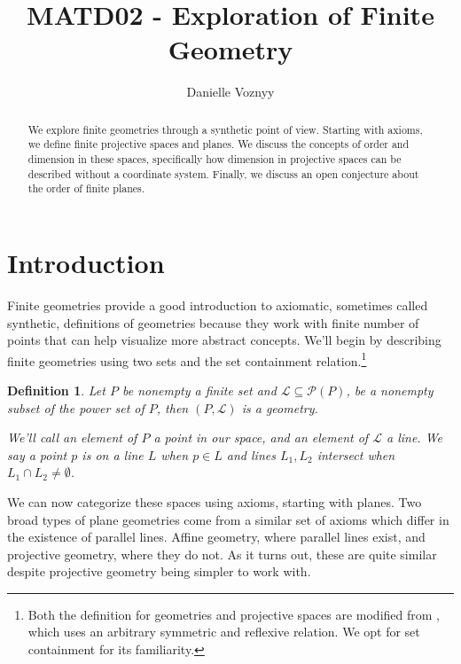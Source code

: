 \documentclass[12pt]{article}
\title{MATD02 - Exploration of Finite Geometry }
\author{Danielle Voznyy}
\date{}
\newtheorem{definition}{Definition}
\begin{document}
    \maketitle

    \begin{abstract}
        We explore finite geometries through a synthetic point of view.
        Starting with axioms, we define finite projective spaces and planes.
        We discuss the concepts of order and dimension in these spaces,
        specifically how dimension in projective spaces can be described without a coordinate system.
        Finally, we discuss an open conjecture about the order of finite planes.
    \end{abstract}


    \section{Introduction}

    Finite geometries provide a good introduction to axiomatic, sometimes called synthetic, definitions of geometries
    because they work with finite number of points that can help visualize more abstract concepts.
    We'll begin by describing finite geometries using two sets and the set containment relation.\footnote{
        Both the definition for geometries and projective spaces are modified from \cite[p.~1,7]{beutelspacher_projective_2000},
        which uses an arbitrary symmetric and reflexive relation.
        We opt for set containment for its familiarity.}

    \begin{definition}
        Let $P$ be nonempty a finite set and $\mathcal{L} \subseteq \mathcal{P}(P)$, be a nonempty subset of the power set of $P$,
        then $(P, \mathcal{L})$ is a geometry.

        We'll call an element of $P$ a point in our space, and an element of $\mathcal{L}$ a line.
        We say a point $p$ is on a line $L$ when $p \in L$ and lines $L_1, L_2$ intersect when $L_1 \cap L_2 \neq \emptyset$.
    \end{definition}

    We can now categorize these spaces using axioms, starting with planes.
    Two broad types of plane geometries come from a similar set of axioms which differ in the existence of parallel lines.
    Affine geometry, where parallel lines exist, and projective geometry, where they do not.
    As it turns out, these are quite similar despite projective geometry being simpler to work with.
\end{document}
